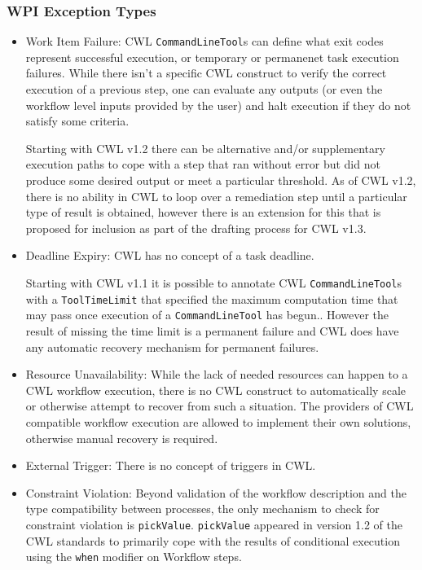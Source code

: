 \subsubsection{WPI Exception Types}
\begin{itemize}
\item Work Item Failure: CWL \verb|CommandLineTool|s can define what exit codes represent successful execution, or temporary or permanenet task execution failures. While there isn't a specific CWL construct to verify the correct execution of a previous step, one can evaluate any outputs (or even the workflow level inputs provided by the user) and halt execution if they do not satisfy some criteria.

Starting with CWL v1.2 there can be alternative and/or supplementary execution paths to cope with a step that ran without error but did not produce some desired output or meet a particular threshold. As of CWL v1.2, there is no ability in CWL to loop over a remediation step until a particular type of result is obtained, however there is an extension for this that is proposed for inclusion as part of the drafting process for CWL v1.3.

\item Deadline Expiry: CWL has no concept of a task deadline.

Starting with CWL v1.1 it is possible to annotate CWL \verb|CommandLineTool|s with a \verb|ToolTimeLimit| that specified the maximum computation time that may pass once execution of a \verb|CommandLineTool| has begun.. However the result of missing the time limit is a permanent failure and CWL does have any automatic recovery mechanism for permanent failures.

\item Resource Unavailability: While the lack of needed resources can happen to a CWL workflow execution, there is no CWL construct to automatically scale or otherwise attempt to recover from such a situation. The providers of CWL compatible workflow execution are allowed to implement their own solutions, otherwise manual recovery is required.

\item External Trigger: There is no concept of triggers in CWL.

\item Constraint Violation: Beyond validation of the workflow description and the type compatibility between processes, the only mechanism to check for constraint violation is \verb|pickValue|. \verb|pickValue| appeared in version 1.2 of the CWL standards to primarily cope with the results of conditional execution using the \verb|when| modifier on Workflow steps.
\end{itemize}
